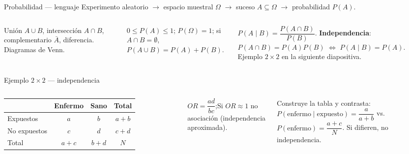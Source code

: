 \documentclass[aspectratio=169,8pt]{beamer}
\begin{document}
\begin{frame}{Probabilidad --- lenguaje}
  \small Experimento aleatorio $\to$ espacio muestral $\Omega$ $\to$ suceso $A\subseteq\Omega$ $\to$ probabilidad $P(A)$.
  \vspace{0.3em}
  \begin{columns}[T,onlytextwidth]
      \begin{tcolorbox}[formulabox,title=Operaciones con sucesos]
        \footnotesize
        Uni\'on $A\cup B$, intersecci\'on $A\cap B$, complementario $\bar A$, diferencia. Diagramas de Venn.
      \end{tcolorbox}
      \begin{tcolorbox}[infobox,title=Kolmogorov]
        \scriptsize $0\le P(A)\le1$; $P(\Omega)=1$; si $A\cap B=\emptyset$, $P(A\cup B)=P(A)+P(B)$.
      \end{tcolorbox}
      \begin{tcolorbox}[tealbox]
        \scriptsize
        $P(A\mid B)=\dfrac{P(A\cap B)}{P(B)}$. \textbf{Independencia}: $P(A\cap B)=P(A)P(B)$ $\iff$ $P(A\mid B)=P(A)$. Ejemplo $2\times2$ en la siguiente diapositiva.
      \end{tcolorbox}
    \end{columns}
\end{frame}

\begin{frame}{Ejemplo $2\times2$ --- independencia}
  \small
  \begin{columns}[T,onlytextwidth]
      \centering
      \begin{tabular}{lccc}
        \toprule
        & \textbf{Enfermo} & \textbf{Sano} & \textbf{Total}\\
        \midrule
        Expuestos & $a$ & $b$ & $a+b$\\
        No expuestos & $c$ & $d$ & $c+d$\\
        \midrule
        Total & $a+c$ & $b+d$ & $N$\\
        \bottomrule
      \end{tabular}
      \vspace{0.4em}
      {\scriptsize $OR=\dfrac{ad}{bc}$;\quad Si $OR\approx1$ no asociaci\'on (independencia aproximada).}
      \begin{tcolorbox}[formulabox,title=Test r\'apido]
        \footnotesize Construye la tabla y contrasta: $P(\text{enfermo}\mid\text{expuesto})=\dfrac{a}{a+b}$ vs.\ $P(\text{enfermo})=\dfrac{a+c}{N}$. Si difieren, no independencia.
      \end{tcolorbox}
    \end{columns}
\end{frame}
\end{document}
